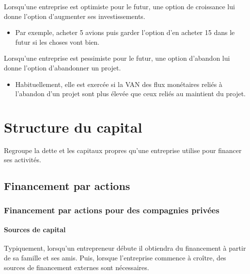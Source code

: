 \documentclass[10pt, french]{article}
\begin{document}
\begin{multicols*}{2}
\begin{definitionNOHFILLsub}
Lorsqu'une entreprise est optimiste pour le futur, une option de croissance lui donne l'option d'augmenter ses investissements.
\begin{itemize}
	\item	Par exemple, acheter 5 avions puis garder l'option d'en acheter 15 dans le futur si les choses vont bien.
\end{itemize}
\end{definitionNOHFILLsub}

\begin{definitionNOHFILLsub}
Lorsqu'une entreprise est pessimiste pour le futur, une option d'abandon lui donne l'option d'abandonner un projet.
\begin{itemize}
	\item	Habituellement, elle est exercée si la VAN des flux monétaires reliés à l'abandon d'un projet sont plus élevée que ceux reliés au maintient du projet.
\end{itemize}
\end{definitionNOHFILLsub}


\pagebreak
\section{Structure du capital}
\begin{definitionNOHFILL}
Regroupe la dette et les capitaux propres qu'une entreprise utilise pour financer ses activités.
\end{definitionNOHFILL}

\subsection{Financement par actions}
\subsubsection{Financement par actions pour des compagnies privées}
\paragraph{Sources de capital}
\begin{rappel_enhanced}[Contexte]
Typiquement, lorsqu'un entrepreneur débute il obtiendra du financement à partir de sa famille et ses amis. Puis, lorsque l'entreprise commence à croître, des sources de financement externes sont nécessaires.
\end{rappel_enhanced}


\end{multicols*}
\end{document}

